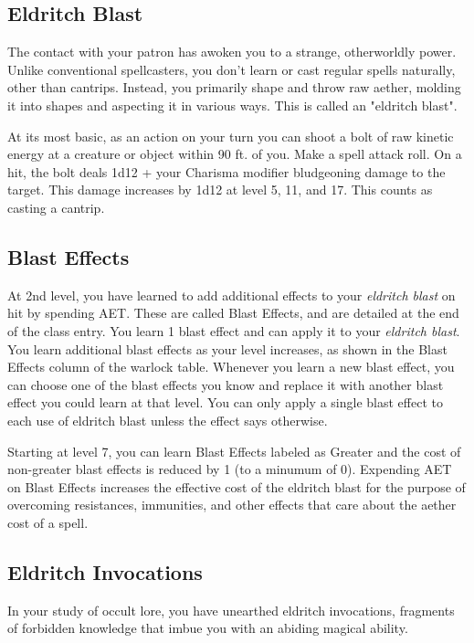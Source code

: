 \subsection{Eldritch Blast}

The contact with your patron has awoken you to a strange, otherworldly power. Unlike conventional spellcasters, you don't learn or cast regular spells naturally, other than cantrips. Instead, you primarily shape and throw raw aether, molding it into shapes and aspecting it in various ways. This is called an "eldritch blast".

At its most basic, as an action on your turn you can shoot a bolt of raw kinetic energy at a creature or object within 90 ft. of you. Make a spell attack roll. On a hit, the bolt deals 1d12 + your Charisma modifier bludgeoning damage to the target. This damage increases by 1d12 at level 5, 11, and 17. This counts as casting a cantrip.

\subsection{Blast Effects}

At 2nd level, you have learned to add additional effects to your \textit{eldritch blast} on hit by spending AET. These are called Blast Effects, and are detailed at the end of the class entry. You learn 1 blast effect and can apply it to your \textit{eldritch blast}. You learn additional blast effects as your level increases, as shown in the Blast Effects column of the warlock table. Whenever you learn a new blast effect, you can choose one of the blast effects you know and replace it with another blast effect you could learn at that level. You can only apply a single blast effect to each use of eldritch blast unless the effect says otherwise.

Starting at level 7, you can learn Blast Effects labeled as Greater and the cost of non-greater blast effects is reduced by 1 (to a minumum of 0). Expending AET on Blast Effects increases the effective cost of the eldritch blast for the purpose of overcoming resistances, immunities, and other effects that care about the aether cost of a spell.

\subsection{Eldritch Invocations}

In your study of occult lore, you have unearthed eldritch invocations, fragments of forbidden knowledge that imbue you with an abiding magical ability.

